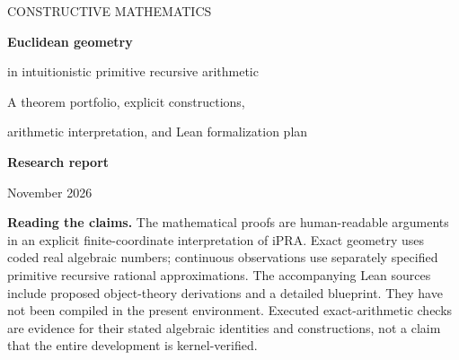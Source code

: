 \documentclass[11pt,a4paper]{article}
\theoremstyle{definition}
\begin{document}
\begin{titlepage}
\vspace*{17mm}
{\color{MidnightBlue}\Large CONSTRUCTIVE MATHEMATICS}\par
\vspace{8mm}
{\Huge\bfseries Euclidean geometry\par}
\vspace{3mm}
{\LARGE in intuitionistic primitive recursive arithmetic\par}
\vspace{12mm}
{\Large A theorem portfolio, explicit constructions,\par
 arithmetic interpretation, and Lean formalization plan}\par
\vspace{15mm}
\noindent\textbf{Research report}\par
{} November 2026\par
\vfill
\noindent\begin{minipage}{0.94\textwidth}
\textbf{Reading the claims.}
The mathematical proofs are human-readable arguments in an explicit
finite-coordinate interpretation of iPRA. Exact geometry uses coded real
algebraic numbers; continuous observations use separately specified
primitive recursive rational approximations. The accompanying Lean sources
include proposed object-theory derivations and a detailed blueprint. They
have not been compiled in the present environment. Executed exact-arithmetic
checks are evidence for their stated algebraic identities and constructions,
not a claim that the entire development is kernel-verified.
\end{minipage}
\vspace{10mm}
\end{titlepage}
{\small\setlength{\parskip}{0pt}\tableofcontents}
\newpage













\end{document}

